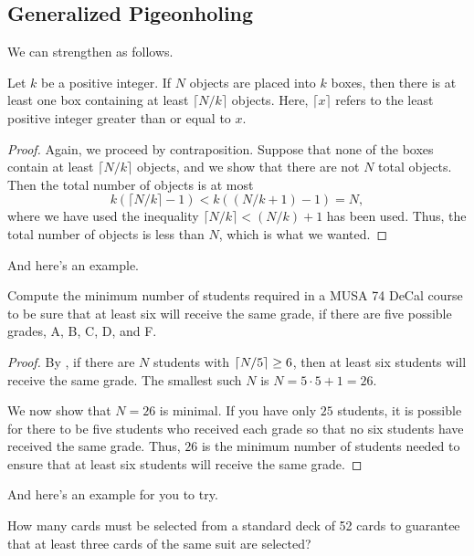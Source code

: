 \documentclass[../notes.tex]{subfiles}
\begin{document}

\subsection{Generalized Pigeonholing}
We can strengthen  as follows.
\begin{theorem} \label{thm:gen-pigeonhole}
    Let $k$ be a positive integer. If $N$ objects are placed into $k$ boxes, then there is at least one box containing at least $ \lceil N/k \rceil $ objects. Here, $\lceil x\rceil$ refers to the least positive integer greater than or equal to $x$.
\end{theorem}
\begin{proof}
    Again, we proceed by contraposition. Suppose that none of the boxes contain at least $\lceil N/k \rceil{}$ objects, and we show that there are not $N$ total objects. Then the total number of objects is at most
    \[k(\lceil N/k \rceil -1) < k((N/k + 1) - 1) = N,\]
    where we have used the inequality $\lceil N/k \rceil < (N/k) + 1$ has been used. Thus, the total number of objects is less than $N$, which is what we wanted.
\end{proof}
And here's an example.
\begin{exe}
    Compute the minimum number of students required in a MUSA 74 DeCal course to be sure that at least six will receive the same grade, if there are five possible grades, A, B, C, D, and F.
\end{exe}
\begin{proof}
    By , if there are $N$ students with $\left\lceil{N/5}\right\rceil\ge6$, then at least six students will receive the same grade. The smallest such $N$ is $N=5\cdot 5+1=26$.
    
    We now show that $N=26$ is minimal. If you have only $25$ students, it is possible for there to be five students who received each grade so that no six students have received the same grade. Thus, $26$ is the
    minimum number of students needed to ensure that at least six students will receive the same
    grade. 
\end{proof}
And here's an example for you to try.
\begin{exe}
    How many cards must be selected from a standard deck of 52 cards to guarantee that at least three cards of the same suit are selected?
\end{exe}
\end{document}
